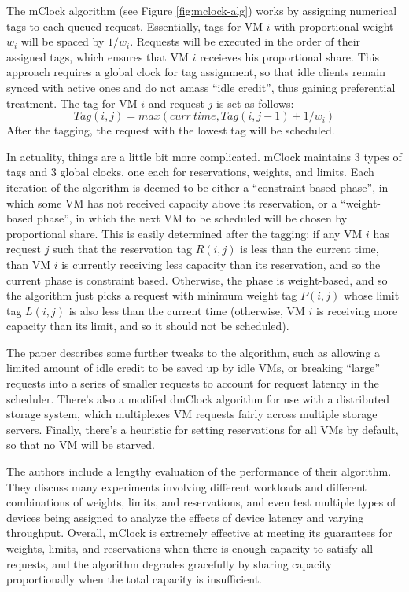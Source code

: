\documentclass[letterpaper, twocolumn]{article}
\begin{document}
The mClock algorithm (see Figure \ref{fig:mclock-alg}) works by assigning numerical tags to each
queued request.  Essentially, tags for VM $i$ with proportional weight $w_i$ will be spaced by $1/w_i$.
Requests will be executed in the order of their assigned tags, which ensures that
VM $i$ receieves his proportional share.  This approach requires a global clock
for tag assignment, so that idle clients remain synced with active ones and do not
amass ``idle credit'', thus gaining preferential treatment.  The tag for VM $i$ and
request $j$ is set as follows:
\[
	Tag(i, j) = max(curr~time, Tag(i, j-1) + 1/w_i)
\]
After the tagging, the request with the lowest tag will be scheduled.

In actuality, things are a little bit more complicated.  mClock maintains
3 types of tags and 3 global clocks, one each for reservations, weights,
and limits.  Each iteration of the algorithm is deemed to be
either a ``constraint-based phase'', in which some VM has not received
capacity above its reservation, or a ``weight-based phase'', in which the
next VM to be scheduled will be chosen by proportional share.  This is easily
determined after the tagging:  if any VM $i$ has request $j$ such that the
reservation tag $R(i, j)$ is less than the current time, than VM $i$ is currently
receiving less capacity than its reservation, and so the current phase is
constraint based.  Otherwise, the phase is weight-based, and so the algorithm
just picks a request with minimum weight tag $P(i, j)$ whose limit tag
$L(i, j)$ is also less than the current time (otherwise, VM $i$ is receiving
more capacity than its limit, and so it should not be scheduled).

The paper describes some further tweaks to the algorithm, such as allowing
a limited amount of idle credit to be saved up by idle VMs, or breaking ``large''
requests into a series of smaller requests to account for request latency
in the scheduler.  There's also a modifed dmClock algorithm for use with
a distributed storage system, which multiplexes VM requests fairly across multiple
storage servers.  Finally, there's a heuristic for setting reservations for
all VMs by default, so that no VM will be starved.

The authors include a lengthy evaluation of the performance of their algorithm.
They discuss many experiments involving different workloads and different combinations
of weights, limits, and reservations, and even test multiple types of devices
being assigned to analyze the effects of device latency and varying throughput.
Overall, mClock is extremely effective at meeting its guarantees for weights, limits,
and reservations when there is enough capacity to satisfy all requests, and
the algorithm degrades gracefully by sharing capacity proportionally when
the total capacity is insufficient.
\end{document}
